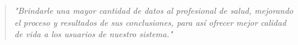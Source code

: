 \begin{quote}
\small \textit{ "Brindarle una mayor cantidad de datos al profesional de salud, mejorando el proceso y resultados de sus conclusiones, para así ofrecer mejor calidad de vida a los usuarios de nuestro sistema."}
 \end{quote}


